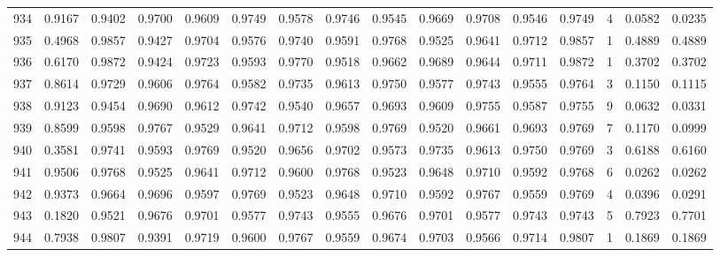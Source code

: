 \begin{tabular}{lrrrrrrrrrrrrrrr}
934 &      0.9167 &  0.9402 &  0.9700 &  0.9609 &  0.9749 &  0.9578 &  0.9746 &  0.9545 &  0.9669 &  0.9708 &   0.9546 &     0.9749 &      4 &                    0.0582 &                     0.0235 \\
935 &      0.4968 &  0.9857 &  0.9427 &  0.9704 &  0.9576 &  0.9740 &  0.9591 &  0.9768 &  0.9525 &  0.9641 &   0.9712 &     0.9857 &      1 &                    0.4889 &                     0.4889 \\
936 &      0.6170 &  0.9872 &  0.9424 &  0.9723 &  0.9593 &  0.9770 &  0.9518 &  0.9662 &  0.9689 &  0.9644 &   0.9711 &     0.9872 &      1 &                    0.3702 &                     0.3702 \\
937 &      0.8614 &  0.9729 &  0.9606 &  0.9764 &  0.9582 &  0.9735 &  0.9613 &  0.9750 &  0.9577 &  0.9743 &   0.9555 &     0.9764 &      3 &                    0.1150 &                     0.1115 \\
938 &      0.9123 &  0.9454 &  0.9690 &  0.9612 &  0.9742 &  0.9540 &  0.9657 &  0.9693 &  0.9609 &  0.9755 &   0.9587 &     0.9755 &      9 &                    0.0632 &                     0.0331 \\
939 &      0.8599 &  0.9598 &  0.9767 &  0.9529 &  0.9641 &  0.9712 &  0.9598 &  0.9769 &  0.9520 &  0.9661 &   0.9693 &     0.9769 &      7 &                    0.1170 &                     0.0999 \\
940 &      0.3581 &  0.9741 &  0.9593 &  0.9769 &  0.9520 &  0.9656 &  0.9702 &  0.9573 &  0.9735 &  0.9613 &   0.9750 &     0.9769 &      3 &                    0.6188 &                     0.6160 \\
941 &      0.9506 &  0.9768 &  0.9525 &  0.9641 &  0.9712 &  0.9600 &  0.9768 &  0.9523 &  0.9648 &  0.9710 &   0.9592 &     0.9768 &      6 &                    0.0262 &                     0.0262 \\
942 &      0.9373 &  0.9664 &  0.9696 &  0.9597 &  0.9769 &  0.9523 &  0.9648 &  0.9710 &  0.9592 &  0.9767 &   0.9559 &     0.9769 &      4 &                    0.0396 &                     0.0291 \\
943 &      0.1820 &  0.9521 &  0.9676 &  0.9701 &  0.9577 &  0.9743 &  0.9555 &  0.9676 &  0.9701 &  0.9577 &   0.9743 &     0.9743 &      5 &                    0.7923 &                     0.7701 \\
944 &      0.7938 &  0.9807 &  0.9391 &  0.9719 &  0.9600 &  0.9767 &  0.9559 &  0.9674 &  0.9703 &  0.9566 &   0.9714 &     0.9807 &      1 &                    0.1869 &                     0.1869 \\

\end{tabular}
